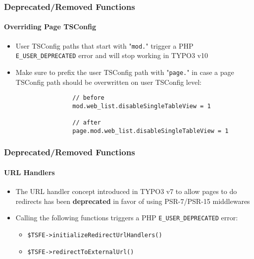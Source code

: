 
\begin{frame}[fragile]
	\frametitle{Deprecated/Removed Functions}
	\framesubtitle{Overriding Page TSConfig}

	\lstset{basicstyle=\smaller\ttfamily}

	\begin{itemize}
		\item User TSConfig paths that start with "\texttt{mod.}" trigger a PHP
			\texttt{E\_USER\_DEPRECATED} error and will stop working in TYPO3 v10
		\item Make sure to prefix the user TSConfig path with "\texttt{page.}"
			in case a page TSConfig path should be overwritten on user TSConfig
			level:

			\begin{lstlisting}
				// before
				mod.web_list.disableSingleTableView = 1

				// after
				page.mod.web_list.disableSingleTableView = 1
			\end{lstlisting}

	\end{itemize}

\end{frame}


\begin{frame}[fragile]
	\frametitle{Deprecated/Removed Functions}
	\framesubtitle{URL Handlers}

	\begin{itemize}
		\item The URL handler concept introduced in TYPO3 v7 to allow pages
			to do redirects has been \textbf{deprecated} in favor of using
			PSR-7/PSR-15 middlewares

		\item Calling the following functions triggers a PHP
			\texttt{E\_USER\_DEPRECATED} error:

			\begin{itemize}
				\item \texttt{\$TSFE->initializeRedirectUrlHandlers()}
				\item \texttt{\$TSFE->redirectToExternalUrl()}
			\end{itemize}

	\end{itemize}

\end{frame}

